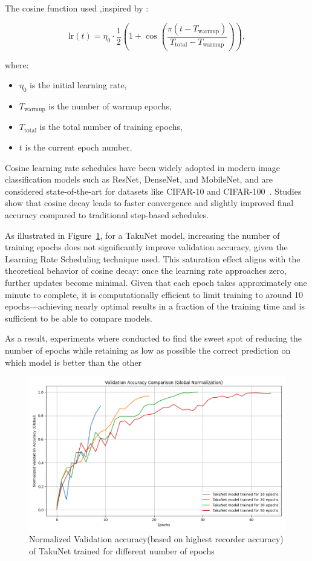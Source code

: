 The cosine function used ,inspired by \cite{loshchilov2016sgdr} : 

\begin{equation}
\text{lr}(t) = \eta_0 \cdot \frac{1}{2} \left( 1 + \cos\left( \frac{\pi (t - T_\text{warmup})}{T_\text{total} - T_\text{warmup}} \right) \right),
\end{equation}

where:
\begin{itemize}
  \item \( \eta_0 \) is the initial learning rate,
  \item \( T_\text{warmup} \) is the number of warmup epochs,
  \item \( T_\text{total} \) is the total number of training epochs,
  \item \( t \) is the current epoch number.
\end{itemize}


Cosine learning rate schedules have been widely adopted in modern image classification models such as ResNet, DenseNet, and MobileNet, and are considered state-of-the-art for datasets like CIFAR-10 and CIFAR-100~\cite{lewkowycz2021decay}. Studies show that cosine decay leads to faster convergence and slightly improved final accuracy compared to traditional step-based schedules.

As illustrated in Figure~\ref{fig:val_accuracy_diff_epochs}, for a TakuNet model, increasing the number of training epochs does not significantly improve validation accuracy, given the Learning Rate Scheduling technique used. This saturation effect aligns with the theoretical behavior of cosine decay: once the learning rate approaches zero, further updates become minimal. Given that each epoch takes approximately one minute to complete, it is computationally efficient to limit training to around 10 epochs—achieving nearly optimal results in a fraction of the training time and is sufficient to be able to compare models.

As a result, experiments where conducted to find the sweet spot of reducing the number of epochs while retaining  as low as possible the correct prediction on which model is better than the other

\begin{figure}[ht]
    \centering
    \includegraphics[width=0.85\linewidth]{Pictures/val_accuracy_comparison_global.png}
    \caption{Normalized Validation accuracy(based on highest recorder accuracy) of TakuNet trained for different number of epochs }
    \label{fig:val_accuracy_diff_epochs}
\end{figure}